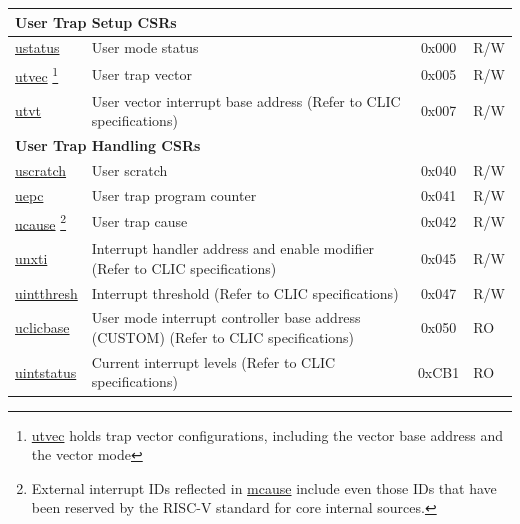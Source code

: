 \begin{longtable}{ | p{4.0cm} | p{8.4cm} | c | l | }
\multicolumn{4}{|l|}{\textbf{User Trap Setup CSRs}} \\\hline
\hyperref[regdesc:USTATUS]{ustatus} & User mode status & 0x000 & R/W \\\hline
\hyperref[regdesc:UTVEC]{utvec} \footnote{\hyperref[regdesc:UTVEC]{utvec} holds trap vector configurations, including the vector base address and the vector mode} & User trap vector & 0x005 & R/W \\\hline
\hyperref[regdesc:UTVT]{utvt} & User vector interrupt base address (Refer to CLIC specifications) & 0x007 & R/W \\\hline
\multicolumn{4}{|l|}{\textbf{User Trap Handling CSRs}} \\\hline
\hyperref[regdesc:USCRATCH]{uscratch} & User scratch & 0x040 & R/W \\\hline
\hyperref[regdesc:UEPC]{uepc} & User trap program counter & 0x041 & R/W \\\hline
\hyperref[regdesc:UCAUSE]{ucause} \footnote{External interrupt IDs reflected in \hyperref[regdesc:MCAUSE]{mcause} include even those IDs that have been reserved by the RISC-V standard for core internal sources.} & User trap cause & 0x042 & R/W \\\hline
\hyperref[regdesc:UNXTI_REG]{unxti} & Interrupt handler address and enable modifier (Refer to CLIC specifications) & 0x045 & R/W \\\hline
\hyperref[regdesc:UINTTHRESH]{uintthresh} & Interrupt threshold (Refer to CLIC specifications) & 0x047 & R/W \\\hline
\hyperref[regdesc:UCLICBASE_REG]{uclicbase} & User mode interrupt controller base address (CUSTOM) (Refer to CLIC specifications) & 0x050 & RO \\\hline
\hyperref[regdesc:UINTSTATUS]{uintstatus} & Current interrupt levels (Refer to CLIC specifications) & 0xCB1 & RO \\\hline


\end{longtable}
